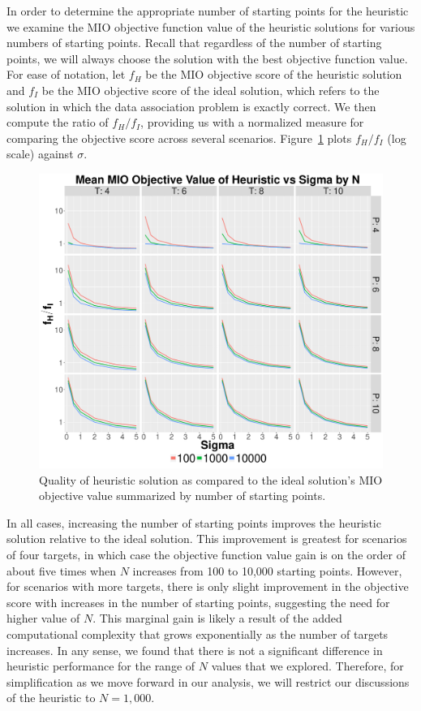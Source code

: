 In order to determine the appropriate number of starting points for the heuristic we examine the MIO objective function value of the heuristic solutions for various numbers of starting points. Recall that regardless of the number of starting points, we will always choose the solution with the best objective function value. For ease of notation, let $f_{H}$ be the MIO objective score of the heuristic solution and $f_{I}$ be the MIO objective score of the ideal solution, which refers to the solution in which the data association problem is exactly correct. We then compute the ratio of $f_{H}/f_{I}$, providing us with a normalized measure for comparing the objective score across several scenarios. Figure~\ref{fig:Basic_Heuristic_Objective} plots $f_{H}/f_{I}$ (log scale) against $\sigma$.
\begin{figure}[ht]
  \centering
  \includegraphics[width=\columnwidth]{../Figures/Basic_Heuristic_Objective}
  \caption{Quality of heuristic solution as compared to the ideal solution's MIO objective value summarized by number of starting points.}
  \label{fig:Basic_Heuristic_Objective}
\end{figure}

In all cases, increasing the number of starting points improves the heuristic solution relative to the ideal solution. This improvement is greatest for scenarios of four targets, in which case the objective function value gain is on the order of about five times when $N$ increases from 100 to 10,000 starting points. However, for scenarios with more targets, there is only slight improvement in the objective score with increases in the number of starting points, suggesting the need for higher value of $N$. This marginal gain is likely a result of the added computational complexity that grows exponentially as the number of targets increases. In any sense, we found that there is not a significant difference in heuristic performance for the range of $N$ values that we explored. Therefore, for simplification as we move forward in our analysis, we will restrict our discussions of the heuristic to $N=1,000$. 

